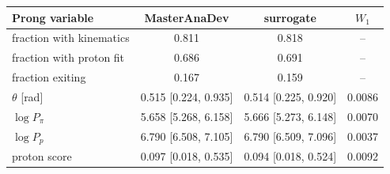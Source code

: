 \begin{tabular}{lccc}
\toprule
Prong variable & MasterAnaDev & surrogate & $W_1$ \\
\midrule
fraction with kinematics & 0.811 & 0.818 & -- \\
fraction with proton fit & 0.686 & 0.691 & -- \\
fraction exiting & 0.167 & 0.159 & -- \\
$\theta$ [rad] & 0.515 [0.224, 0.935] & 0.514 [0.225, 0.920] & 0.0086 \\
$\log P_\pi$ & 5.658 [5.268, 6.158] & 5.666 [5.273, 6.148] & 0.0070 \\
$\log P_p$ & 6.790 [6.508, 7.105] & 6.790 [6.509, 7.096] & 0.0037 \\
proton score & 0.097 [0.018, 0.535] & 0.094 [0.018, 0.524] & 0.0092 \\
\bottomrule
\end{tabular}

